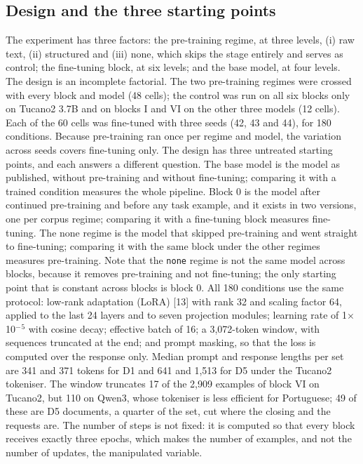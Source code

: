 \documentclass{IOS-Book-Article}
\begin{document}
\subsection{Design and the three starting points}
The experiment has three factors: the pre-training regime, at three levels, (i) raw text, (ii) structured and (iii) none, which skips the stage entirely and serves as control; the fine-tuning block, at six levels; and the base model, at four levels. The design is an incomplete factorial. The two pre-training regimes were crossed with every block and model (48 cells); the control was run on all six blocks only on Tucano2 3.7B and on blocks I and VI on the other three models (12 cells). Each of the 60 cells was fine-tuned with three seeds (42, 43 and 44), for 180 conditions. Because pre-training ran once per regime and model, the variation across seeds covers fine-tuning only.
The design has three untreated starting points, and each answers a different question. The base model is the model as published, without pre-training and without fine-tuning; comparing it with a trained condition measures the whole pipeline. Block 0 is the model after continued pre-training and before any task example, and it exists in two versions, one per corpus regime; comparing it with a fine-tuning block measures fine-tuning. The none regime is the model that skipped pre-training and went straight to fine-tuning; comparing it with the same block under the other regimes measures pre-training. Note that the \texttt{none} regime is not the same model across blocks, because it removes pre-training and not fine-tuning; the only starting point that is constant across blocks is block 0.
All 180 conditions use the same protocol: low-rank adaptation (LoRA) [13] with rank 32 and scaling factor 64, applied to the last 24 layers and to seven projection modules; learning rate of 1$\times$10$^{-}$$^{5}$ with cosine decay; effective batch of 16; a 3,072-token window, with sequences truncated at the end; and prompt masking, so that the loss is computed over the response only. Median prompt and response lengths per set are 341 and 371 tokens for D1 and 641 and 1,513 for D5 under the Tucano2 tokeniser. The window truncates 17 of the 2,909 examples of block VI on Tucano2, but 110 on Qwen3, whose tokeniser is less efficient for Portuguese; 49 of these are D5 documents, a quarter of the set, cut where the closing and the requests are. The number of steps is not fixed: it is computed so that every block receives exactly three epochs, which makes the number of examples, and not the number of updates, the manipulated variable.
\end{document}
